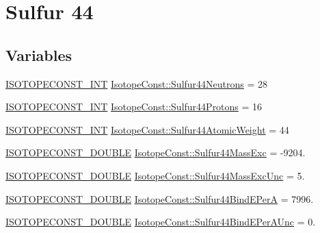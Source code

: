 \hypertarget{group___isotope_const-_sulfur-_s44}{}\section{Sulfur 44}
\label{group___isotope_const-_sulfur-_s44}
\subsection*{Variables}
\begin{DoxyCompactItemize}
\item 
\mbox{\hyperlink{group___isotope_const-_macros_ga5f18360b3e99483a35c32d789e62621c}{I\+S\+O\+T\+O\+P\+E\+C\+O\+N\+S\+T\+\_\+\+I\+NT}} \mbox{\hyperlink{group___isotope_const-_sulfur-_s44_ga822e0a8903dea6e64d65beb632f076d0}{Isotope\+Const\+::\+Sulfur44\+Neutrons}} = 28
\item 
\mbox{\hyperlink{group___isotope_const-_macros_ga5f18360b3e99483a35c32d789e62621c}{I\+S\+O\+T\+O\+P\+E\+C\+O\+N\+S\+T\+\_\+\+I\+NT}} \mbox{\hyperlink{group___isotope_const-_sulfur-_s44_gac4faeb25b560a0503c9f7f0b03f942ac}{Isotope\+Const\+::\+Sulfur44\+Protons}} = 16
\item 
\mbox{\hyperlink{group___isotope_const-_macros_ga5f18360b3e99483a35c32d789e62621c}{I\+S\+O\+T\+O\+P\+E\+C\+O\+N\+S\+T\+\_\+\+I\+NT}} \mbox{\hyperlink{group___isotope_const-_sulfur-_s44_ga68ca9a95a141b35988fc861201869ddd}{Isotope\+Const\+::\+Sulfur44\+Atomic\+Weight}} = 44
\item 
\mbox{\hyperlink{group___isotope_const-_macros_ga8f45a7272ce02c0b4c65c44636ed719a}{I\+S\+O\+T\+O\+P\+E\+C\+O\+N\+S\+T\+\_\+\+D\+O\+U\+B\+LE}} \mbox{\hyperlink{group___isotope_const-_sulfur-_s44_gab661e340ae6752a4eba1f2cd3837d767}{Isotope\+Const\+::\+Sulfur44\+Mass\+Exc}} = -\/9204.
\item 
\mbox{\hyperlink{group___isotope_const-_macros_ga8f45a7272ce02c0b4c65c44636ed719a}{I\+S\+O\+T\+O\+P\+E\+C\+O\+N\+S\+T\+\_\+\+D\+O\+U\+B\+LE}} \mbox{\hyperlink{group___isotope_const-_sulfur-_s44_ga4eb05448a88cd8fa12d362a03a87828a}{Isotope\+Const\+::\+Sulfur44\+Mass\+Exc\+Unc}} = 5.
\item 
\mbox{\hyperlink{group___isotope_const-_macros_ga8f45a7272ce02c0b4c65c44636ed719a}{I\+S\+O\+T\+O\+P\+E\+C\+O\+N\+S\+T\+\_\+\+D\+O\+U\+B\+LE}} \mbox{\hyperlink{group___isotope_const-_sulfur-_s44_ga5cfbd9aa2d10d7919015c029213f9c1b}{Isotope\+Const\+::\+Sulfur44\+Bind\+E\+PerA}} = 7996.
\item 
\mbox{\hyperlink{group___isotope_const-_macros_ga8f45a7272ce02c0b4c65c44636ed719a}{I\+S\+O\+T\+O\+P\+E\+C\+O\+N\+S\+T\+\_\+\+D\+O\+U\+B\+LE}} \mbox{\hyperlink{group___isotope_const-_sulfur-_s44_gae96dfb6508c176a13bd55a89d5817709}{Isotope\+Const\+::\+Sulfur44\+Bind\+E\+Per\+A\+Unc}} = 0.

\end{DoxyCompactItemize}
